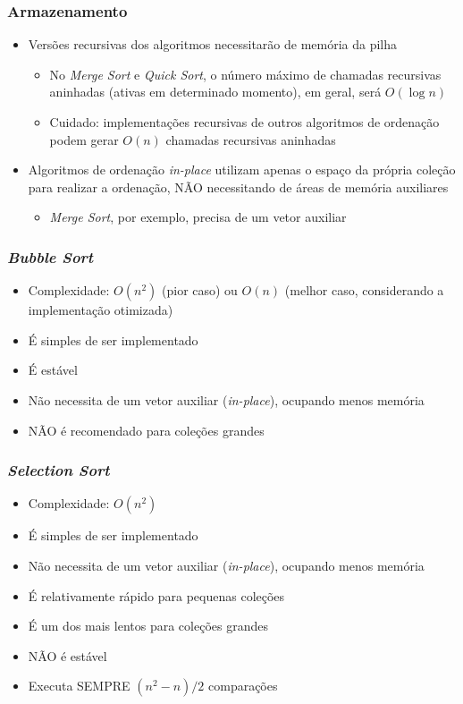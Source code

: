 \documentclass[aspectratio=169]{beamer}
\begin{document}
\begin{frame}\frametitle{Armazenamento}
\begin{itemize}	
	\item Versões recursivas dos algoritmos necessitarão de memória da pilha
	\begin{itemize}	
		\item No \emph{Merge Sort} e \emph{Quick Sort}, o número máximo de chamadas recursivas aninhadas (ativas em determinado momento), em geral, será $O(\log{n})$
		\item Cuidado: implementações recursivas de outros algoritmos de ordenação podem gerar $O(n)$ chamadas recursivas aninhadas
	\end{itemize}
	\item Algoritmos de ordenação \emph{in-place} utilizam apenas o espaço da própria coleção para realizar a ordenação, NÃO necessitando de áreas de memória auxiliares
	\begin{itemize}	
		\item \emph{Merge Sort}, por exemplo, precisa de um vetor auxiliar
	\end{itemize}
	\end{itemize}
\end{frame}

\begin{frame}\frametitle{\emph{Bubble Sort}}
\begin{itemize}
	\item Complexidade: $O(n^2)$ (pior caso) ou $O(n)$ (melhor caso, considerando a implementação otimizada)
	\item É simples de ser implementado
	\item É estável
	\item Não necessita de um vetor auxiliar (\emph{in-place}), ocupando menos memória
	\item NÃO é recomendado para coleções grandes
\end{itemize}
\end{frame}

\begin{frame}\frametitle{\emph{Selection Sort}}
\begin{itemize}
	\item Complexidade: $O(n^2)$
	\item É simples de ser implementado
	\item Não necessita de um vetor auxiliar (\emph{in-place}), ocupando menos memória
	\item É relativamente rápido para pequenas coleções
	\item É um dos mais lentos para coleções grandes
	\item NÃO é estável
	\item Executa SEMPRE $(n^2-n)/2$ comparações
\end{itemize}
\end{frame}
\end{document}
